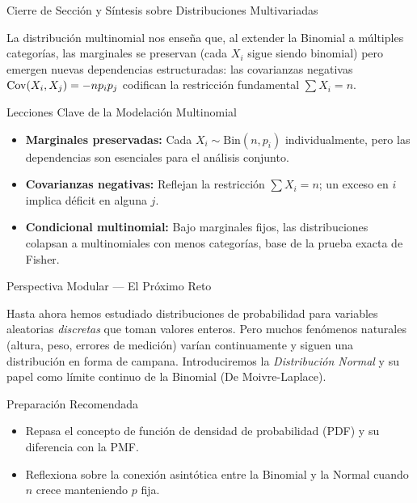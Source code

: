 \documentclass[10pt, aspectratio=169]{beamer}
\begin{document}
\begin{frame}{Cierre de Sección y Síntesis sobre Distribuciones Multivariadas}
  \begin{reflexion}
    La distribución multinomial nos enseña que, al extender la Binomial a múltiples categorías, las marginales se preservan (cada $X_{i}$ sigue siendo binomial) pero emergen nuevas dependencias estructuradas: las covarianzas negativas $\operatorname{Cov}(X_{i}, X_{j}) = -n p_{i} p_{j}$ codifican la restricción fundamental $\sum X_{i} = n$.
  \end{reflexion}

  \vspace{0.2cm}
  \pause
  \begin{block}{Lecciones Clave de la Modelación Multinomial}
    \begin{itemize}\itemsep=0.08cm
      \item \textbf{Marginales preservadas:} Cada $X_{i} \sim \text{Bin}(n, p_{i})$ individualmente, pero las dependencias son esenciales para el análisis conjunto.
      \item \textbf{Covarianzas negativas:} Reflejan la restricción $\sum X_{i} = n$; un exceso en $i$ implica déficit en alguna $j$.
      \item \textbf{Condicional multinomial:} Bajo marginales fijos, las distribuciones colapsan a multinomiales con menos categorías, base de la prueba exacta de Fisher.
    \end{itemize}
  \end{block}
\end{frame}

\begin{frame}{Perspectiva Modular --- El Próximo Reto}
  \scriptsize
  \begin{retoclase}
    Hasta ahora hemos estudiado distribuciones de probabilidad para variables aleatorias \emph{discretas} que toman valores enteros. Pero muchos fenómenos naturales (altura, peso, errores de medición) varían continuamente y siguen una distribución en forma de campana. Introduciremos la \emph{Distribución Normal} y su papel como límite continuo de la Binomial (De Moivre-Laplace).
  \end{retoclase}

  \vspace{0.08cm}
  \pause
  \begin{alertblock}{Preparación Recomendada}
    \begin{itemize}\itemsep=0.06cm
      \item Repasa el concepto de función de densidad de probabilidad (PDF) y su diferencia con la PMF.
      \item Reflexiona sobre la conexión asintótica entre la Binomial y la Normal cuando $n$ crece manteniendo $p$ fija.
    \end{itemize}
  \end{alertblock}
\end{frame}
\end{document}
